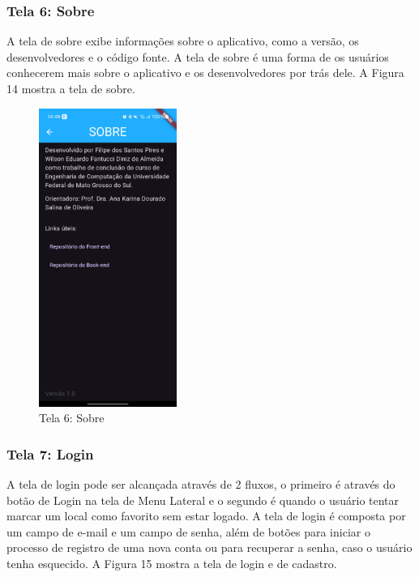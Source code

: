 \subsubsection{Tela 6: Sobre}

    A tela de sobre exibe informações sobre o aplicativo, como a versão, os desenvolvedores e o código fonte. A tela de sobre é uma forma de os usuários conhecerem mais sobre o aplicativo e os desenvolvedores por trás dele. A Figura 14 mostra a tela de sobre.

    \begin{figure}[h]
        \centering
        \includegraphics[width=0.4\textwidth]{imagens/sobre.jpg}
        \caption{\scriptsize Tela 6: Sobre}
        \label{fig:tela6}
    \end{figure}

    \FloatBarrier

\subsubsection{Tela 7: Login}

    A tela de login pode ser alcançada através de 2 fluxos, o primeiro é através do botão de Login na tela de Menu Lateral e o segundo é quando o usuário tentar marcar um local como favorito sem estar logado. A tela de login é composta por um campo de e-mail e um campo de senha, além de botões para iniciar o processo de registro de uma nova conta ou para recuperar a senha, caso o usuário tenha esquecido. A Figura 15 mostra a tela de login e de cadastro.

